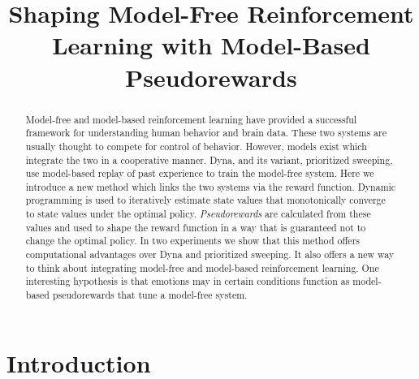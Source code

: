 \documentclass[letterpaper]{article}
\begin{document}
%

\title{Shaping Model-Free Reinforcement Learning with Model-Based Pseudorewards}
\date{}
\maketitle
\begin{abstract}
Model-free and model-based reinforcement learning have provided a successful framework for understanding human behavior and brain data. These two systems are usually thought to compete for control of behavior. However, models exist which integrate the two in a cooperative manner. Dyna, and its variant, prioritized sweeping, use model-based replay of past experience to train the model-free system. Here we introduce a new method which links the two systems via the reward function. Dynamic programming is used to iteratively estimate state values that monotonically converge to state values under the optimal policy. \textit{Pseudorewards} are calculated from these values and used to shape the reward function in a way that is guaranteed not to change the optimal policy. In two experiments we show that this method offers computational advantages over Dyna and prioritized sweeping. It also offers a new way to think about integrating model-free and model-based reinforcement learning. One interesting hypothesis is that emotions may in certain conditions function as model-based pseudorewards that tune a model-free system.
\end{abstract}

\section{Introduction}
\end{document}
